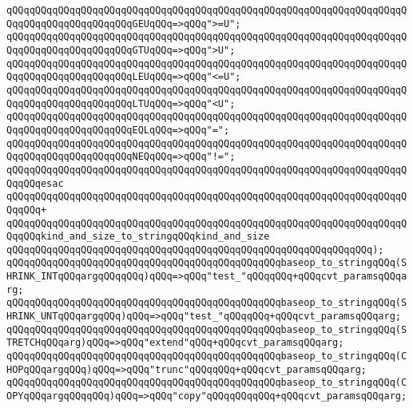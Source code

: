 \verb|qQQqqQQqqQQqqQQqqQQqqQQqqQQqqQQqqQQqqQQqqQQqqQQqqQQqqQQqqQQqqQQqqQQqqQQqqQQqqQQqqQQqqQQqqQQqGEUqQQq=>qQQq">=U";|\newline
\verb|qQQqqQQqqQQqqQQqqQQqqQQqqQQqqQQqqQQqqQQqqQQqqQQqqQQqqQQqqQQqqQQqqQQqqQQqqQQqqQQqqQQqqQQqqQQqGTUqQQq=>qQQq">U";|\newline
\verb|qQQqqQQqqQQqqQQqqQQqqQQqqQQqqQQqqQQqqQQqqQQqqQQqqQQqqQQqqQQqqQQqqQQqqQQqqQQqqQQqqQQqqQQqqQQqLEUqQQq=>qQQq"<=U";|\newline
\verb|qQQqqQQqqQQqqQQqqQQqqQQqqQQqqQQqqQQqqQQqqQQqqQQqqQQqqQQqqQQqqQQqqQQqqQQqqQQqqQQqqQQqqQQqqQQqLTUqQQq=>qQQq"<U";|\newline
\verb|qQQqqQQqqQQqqQQqqQQqqQQqqQQqqQQqqQQqqQQqqQQqqQQqqQQqqQQqqQQqqQQqqQQqqQQqqQQqqQQqqQQqqQQqqQQqEQLqQQq=>qQQq"=";|\newline
\verb|qQQqqQQqqQQqqQQqqQQqqQQqqQQqqQQqqQQqqQQqqQQqqQQqqQQqqQQqqQQqqQQqqQQqqQQqqQQqqQQqqQQqqQQqqQQqNEQqQQq=>qQQq"!=";|\newline
\verb|qQQqqQQqqQQqqQQqqQQqqQQqqQQqqQQqqQQqqQQqqQQqqQQqqQQqqQQqqQQqqQQqqQQqqQQqqQQqesac|\newline
\verb|qQQqqQQqqQQqqQQqqQQqqQQqqQQqqQQqqQQqqQQqqQQqqQQqqQQqqQQqqQQqqQQqqQQqqQQqqQQq+|\newline
\verb|qQQqqQQqqQQqqQQqqQQqqQQqqQQqqQQqqQQqqQQqqQQqqQQqqQQqqQQqqQQqqQQqqQQqqQQqqQQqkind_and_size_to_stringqQQqkind_and_size|\newline
\verb|qQQqqQQqqQQqqQQqqQQqqQQqqQQqqQQqqQQqqQQqqQQqqQQqqQQqqQQqqQQqqQQq);|\newline
\newline
\verb|qQQqqQQqqQQqqQQqqQQqqQQqqQQqqQQqqQQqqQQqqQQqqQQqbaseop_to_stringqQQq(SHRINK_INTqQQqargqQQqqQQq)qQQq=>qQQq"test_"qQQqqQQq+qQQqcvt_paramsqQQqarg;|\newline
\verb|qQQqqQQqqQQqqQQqqQQqqQQqqQQqqQQqqQQqqQQqqQQqqQQqbaseop_to_stringqQQq(SHRINK_UNTqQQqargqQQq)qQQq=>qQQq"test_"qQQqqQQq+qQQqcvt_paramsqQQqarg;|\newline
\verb|qQQqqQQqqQQqqQQqqQQqqQQqqQQqqQQqqQQqqQQqqQQqqQQqbaseop_to_stringqQQq(STRETCHqQQqarg)qQQq=>qQQq"extend"qQQq+qQQqcvt_paramsqQQqarg;|\newline
\verb|qQQqqQQqqQQqqQQqqQQqqQQqqQQqqQQqqQQqqQQqqQQqqQQqbaseop_to_stringqQQq(CHOPqQQqargqQQq)qQQq=>qQQq"trunc"qQQqqQQq+qQQqcvt_paramsqQQqarg;|\newline
\verb|qQQqqQQqqQQqqQQqqQQqqQQqqQQqqQQqqQQqqQQqqQQqqQQqbaseop_to_stringqQQq(COPYqQQqargqQQqqQQq)qQQq=>qQQq"copy"qQQqqQQqqQQq+qQQqcvt_paramsqQQqarg;|\newline
\newline
